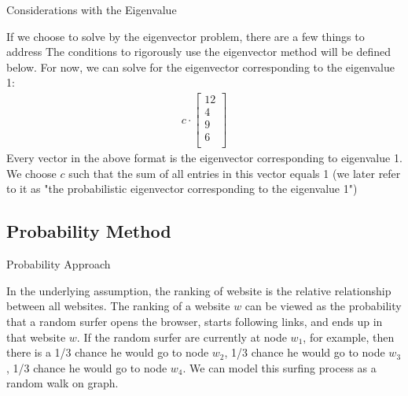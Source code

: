 \documentclass{beamer}
\begin{document}
\begin{frame}[t]{Considerations with the Eigenvalue}
\begin{outline}
    \1 If we choose to solve by the eigenvector problem, there are a few things to address
    \1 The conditions to rigorously use the eigenvector method will be defined below. For now, we can solve for the eigenvector corresponding to the eigenvalue 1:
    \begin{align*}
        c\cdot \begin{bmatrix}
            12\\ 4\\ 9\\ 6\\
        \end{bmatrix}
    \end{align*}
    \1 Every vector in the above format is the eigenvector corresponding to eigenvalue 1. 
    \1 We choose $c$ such that the sum of all entries in this vector equals 1 (we later refer to it as "the probabilistic eigenvector corresponding to the eigenvalue 1")
\end{outline}
\end{frame}

\subsection{Probability Method}
\begin{frame}[t]{Probability Approach}
    \begin{outline}
        \1 In the underlying assumption, the ranking of website is the relative relationship between all websites. 
        \1 The ranking of a website $w$ can be viewed as the probability that a random surfer opens the browser, starts following links, and ends up in that website $w$.
        \1 If the random surfer are currently at node $w_1$, for example, then there is a 1/3 chance he would go to node $w_2$, 1/3 chance he would go to node $w_3$, 1/3 chance he would go to node $w_4$. 
        \1 We can model this surfing process as a random walk on graph. 
    \end{outline}
\end{frame}
\end{document}
